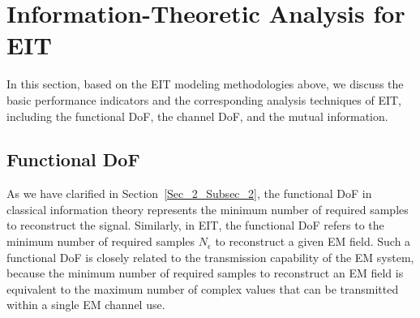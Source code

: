 \documentclass[journal,twocolumn]{IEEEtran}
\begin{document}

\section{Information-Theoretic Analysis for EIT}
In this section, based on the EIT modeling methodologies above, we discuss the basic performance indicators and the corresponding analysis techniques of EIT, including the functional DoF, the channel DoF, and the mutual information.  

\vspace{-1em}
\subsection{Functional DoF}\label{Sec_4_Subsec_1}
As we have clarified in Section~\ref{Sec_2_Subsec_2}, the functional DoF in classical information theory represents the minimum number of required samples to reconstruct the signal. Similarly, in EIT, the functional DoF refers to the minimum number of required samples $N_\epsilon$ to reconstruct a given EM field. 
Such a functional DoF is closely related to the transmission capability of the EM system, because the minimum number of required samples to reconstruct an EM field is equivalent to the maximum number of complex values that can be transmitted within a single EM channel use. 
\end{document}
